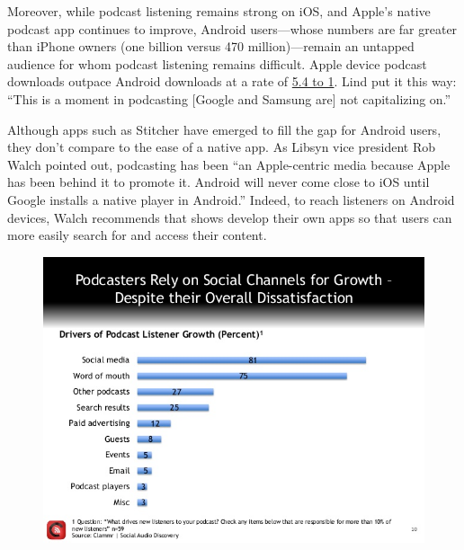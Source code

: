 \documentclass[notoc, symmetric, nobib, nols]{towcenter-guideto-book}
\begin{document}
Moreover, while podcast listening remains strong on iOS, and Apple's native podcast app continues to improve, Android users---whose numbers are far greater than iPhone owners (one billion versus 470 million)---remain an untapped audience for whom podcast listening remains difficult.\autocite{smartphones} Apple device podcast downloads outpace Android downloads at a rate of \href{http://www.libsyn.com/wp-content/uploads/2015/06/PRLibsynNetGrowth021915Final.pdf}{5.4 to 1}.\autocite{libsyndata} Lind put it this way: ``This is a moment in podcasting [Google and Samsung are] not capitalizing on.''\autocite{lind} 

Although apps such as Stitcher have emerged to fill the gap for Android users, they don't compare to the ease of a native app. As Libsyn vice president Rob Walch pointed out, podcasting has been ``an Apple-centric media because Apple has been behind it to promote it. Android will never come close to iOS until Google installs a native player in Android.'' Indeed, to reach listeners on Android devices, Walch recommends that shows develop their own apps so that users can more easily search for and access their content.\autocite{Walch} 

\begin{figure}
\begin{centering}
\includegraphics[width=.9\textwidth]{graphics/PODCAST15_clammrfuture_drivers.jpg}
\caption{}
\end{centering}
\end{figure}
\end{document}

